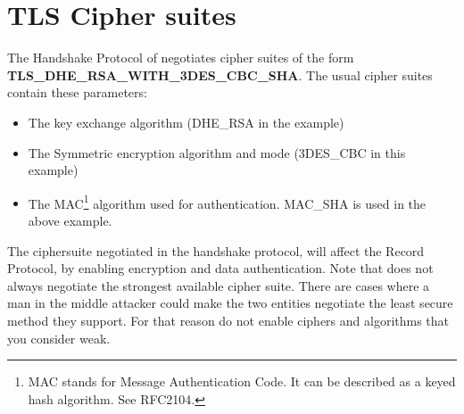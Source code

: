 \newpage
\section{TLS Cipher suites}
\par 
The Handshake Protocol of \tlsI{} negotiates cipher suites 
of the form \\
{\bf TLS\_DHE\_RSA\_WITH\_3DES\_CBC\_SHA}.
The usual cipher suites contain these parameters:
\begin{itemize}
\item The key exchange algorithm (DHE\_RSA in the example)
\item The Symmetric encryption algorithm and mode (3DES\_CBC in this
example)
\item The MAC\footnote{MAC stands for Message Authentication Code. It can
be described as a keyed hash algorithm. See RFC2104.} algorithm used for authentication.
MAC\_SHA is used in the above example.
\end{itemize}

The ciphersuite negotiated in the handshake protocol, will affect 
the Record Protocol, by enabling encryption and data authentication.
Note that \tlsI{} does not always
negotiate the strongest available cipher suite. There are cases where
a man in the middle attacker could make the two entities negotiate
the least secure method they support. For that reason do not enable
ciphers and algorithms that you consider weak.

\addvspace{1.5cm}

